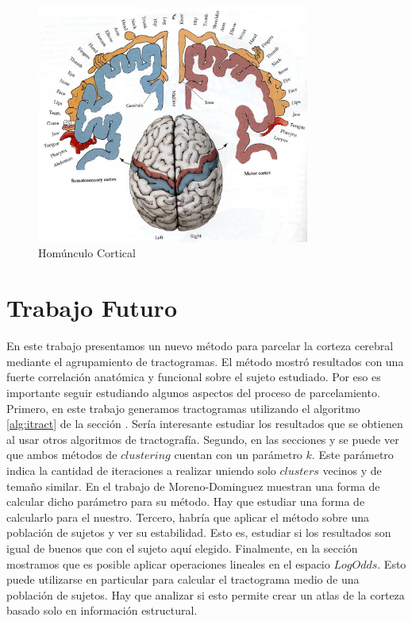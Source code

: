 \begin{figure}[h!]
    \centering
    \includegraphics[width=0.8\textwidth]{img/homunculus.jpg}
    \caption{Hom\'unculo Cortical}
    \label{fig:homunculo}
\end{figure}

\section{Trabajo Futuro}
En este trabajo presentamos un nuevo m\'etodo para parcelar la corteza
cerebral mediante el agrupamiento de tractogramas. El m\'etodo mostr\'o
resultados con una fuerte correlaci\'on anat\'omica y funcional sobre el
sujeto estudiado. Por eso es importante seguir estudiando algunos aspectos
del proceso de parcelamiento. Primero, en este trabajo generamos 
tractogramas utilizando el algoritmo \ref{alg:itract} de la secci\'on 
\label{sec:convergencia}. Ser\'ia interesante estudiar los resultados
que se obtienen al usar otros algoritmos de tractograf\'ia. Segundo, 
en las secciones \label{sec:clustering_moreno} y \label{sec:nuestro_clustering} se puede ver que ambos m\'etodos de $clustering$
cuentan con un par\'ametro $k$. Este par\'ametro indica la cantidad de iteraciones a realizar uniendo solo $clusters$ vecinos y de tema\~no
similar. En el trabajo de Moreno-Dominguez \cite{Moreno-Dominguez2014} 
muestran una forma de calcular dicho par\'ametro para su m\'etodo. Hay
que estudiar una forma de calcularlo para el nuestro. Tercero, habr\'ia
que aplicar el m\'etodo sobre una poblaci\'on de sujetos y ver su
estabilidad. Esto es, estudiar si los resultados son igual de buenos que
con el sujeto aqu\'i elegido. Finalmente, en la secci\'on 
\label{sec:logit} mostramos que es posible aplicar operaciones
lineales en el espacio $LogOdds$. Esto puede utilizarse en particular para
calcular el tractograma medio de una poblaci\'on de sujetos. Hay que 
analizar si esto permite crear un atlas de la corteza basado solo en
informaci\'on estructural.

